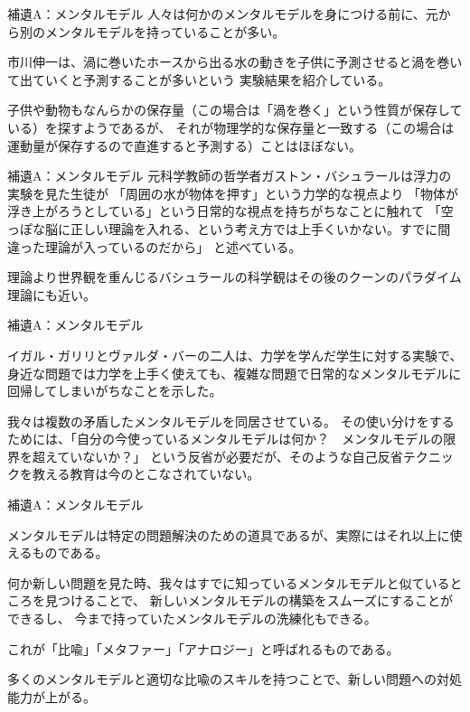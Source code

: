 \documentclass[12pt, unicode]{beamer}
\begin{document}
\begin{frame}{補遺A：メンタルモデル}
人々は何かのメンタルモデルを身につける前に、元から別のメンタルモデルを持っていることが多い。

市川伸一は、渦に巻いたホースから出る水の動きを子供に予測させると渦を巻いて出ていくと予測することが多いという
実験結果を紹介している。

子供や動物もなんらかの保存量（この場合は「渦を巻く」という性質が保存している）を探すようであるが、
それが物理学的な保存量と一致する（この場合は運動量が保存するので直進すると予測する）ことはほぼない。

\end{frame}

\begin{frame}{補遺A：メンタルモデル}
元科学教師の哲学者ガストン・バシュラールは浮力の実験を見た生徒が
「周囲の水が物体を押す」という力学的な視点より
「物体が浮き上がろうとしている」という日常的な視点を持ちがちなことに触れて
「空っぽな脳に正しい理論を入れる、という考え方では上手くいかない。すでに間違った理論が入っているのだから」
と述べている。

理論より世界観を重んじるバシュラールの科学観はその後のクーンのパラダイム理論にも近い。

\end{frame}

\begin{frame}{補遺A：メンタルモデル}

イガル・ガリリとヴァルダ・バーの二人は、力学を学んだ学生に対する実験で、
身近な問題では力学を上手く使えても、複雑な問題で日常的なメンタルモデルに回帰してしまいがちなことを示した。

我々は複数の矛盾したメンタルモデルを同居させている。
その使い分けをするためには、「自分の今使っているメンタルモデルは何か？　メンタルモデルの限界を超えていないか？」
という反省が必要だが、そのような自己反省テクニックを教える教育は今のとこなされていない。

\end{frame}

\begin{frame}{補遺A：メンタルモデル}

メンタルモデルは特定の問題解決のための道具であるが、実際にはそれ以上に使えるものである。

何か新しい問題を見た時、我々はすでに知っているメンタルモデルと似ているところを見つけることで、
新しいメンタルモデルの構築をスムーズにすることができるし、
今まで持っていたメンタルモデルの洗練化もできる。

これが「比喩」「メタファー」「アナロジー」と呼ばれるものである。

多くのメンタルモデルと適切な比喩のスキルを持つことで、新しい問題への対処能力が上がる。

\end{frame}
\end{document}
